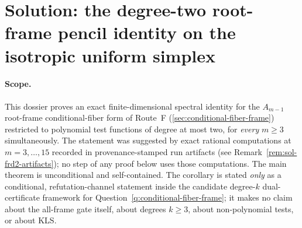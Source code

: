 \documentclass[../main.tex]{subfiles}
\begin{document}
%
%
%
%
%

\section*{Solution: the degree-two root-frame pencil identity on the isotropic uniform
simplex}
\label{sec:sol-lem-fiber-root-degree-two}

\paragraph{Scope.}
This dossier proves an exact finite-dimensional spectral identity for the $A_{m-1}$
root-frame conditional-fiber form of
Route~F (\ref{sec:conditional-fiber-frame}) restricted to polynomial test functions of
degree at most two, for \emph{every} $m\ge3$ simultaneously.  The statement was
suggested by exact rational computations at $m=3,\dots,15$ recorded in
provenance-stamped run artifacts (see Remark~\ref{rem:sol-frd2-artifacts}); no step of
any proof below uses those computations.  The main theorem is unconditional and
self-contained.  The corollary is stated \emph{only} as a conditional,
refutation-channel statement inside the candidate degree-$k$ dual-certificate framework
for Question~\ref{q:conditional-fiber-frame}; it makes no claim about the all-frame
gate itself, about degrees $k\ge3$, about non-polynomial tests, or about KLS.
\end{document}
